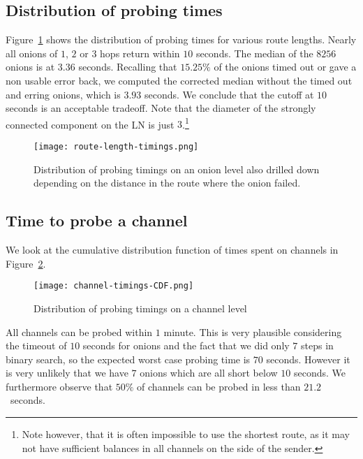 \subsection{Distribution of probing times}
Figure~\ref{fig:route-length-timings} shows the distribution of probing times for various route lengths.
Nearly all onions of $1$, $2$ or $3$ hops return within $10$ seconds.
The median of the $8256$ onions is at $3.36$ seconds.
Recalling that $15.25\%$ of the onions timed out or gave a non usable error back, we computed the corrected median without the timed out and erring onions, which is $3.93$ seconds. 
We conclude that the cutoff at $10$ seconds is an acceptable tradeoff.
Note that the diameter of the strongly connected component on the LN is just $3$.\footnote{Note however, that it is often impossible to use the shortest route, as it may not have sufficient balances in all channels on the side of the sender.}

\begin{figure}[]
	\centering
	\texttt{[image: route-length-timings.png]}
	\caption{Distribution of probing timings on an onion level also drilled down depending on the distance in the route where the onion failed.}
	\label{fig:route-length-timings}
\end{figure}




\subsection{Time to probe a channel}

We look at the cumulative distribution function of times spent on channels in Figure~\ref{fig:channel-timings-CDF}.

\begin{figure}[]
	\centering
	\texttt{[image: channel-timings-CDF.png]}
	\caption{Distribution of probing timings on a channel level}
	\label{fig:channel-timings-CDF}
\end{figure}

All channels can be probed within $1$ minute.
This is very plausible considering the timeout of $10$ seconds for onions and the fact that we did only $7$ steps in binary search, so the expected worst case probing time is $70$ seconds.
However it is very unlikely that we have $7$ onions which are all short below $10$ seconds.
We furthermore observe that $50\%$ of channels can be probed in less than $21.2$~seconds.%

